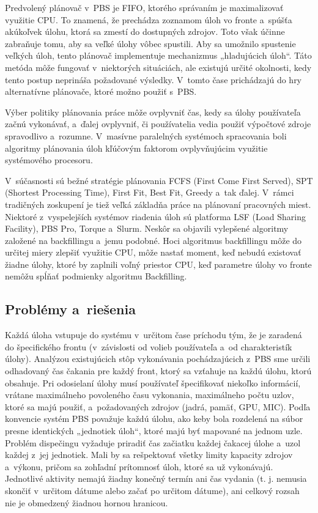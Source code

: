 Predvolený plánovač v~PBS je FIFO, ktorého správaním je maximalizovať využitie CPU. To znamená, že prechádza zoznamom úloh vo fronte a~spúšťa akúkoľvek úlohu, ktorá sa zmestí do dostupných zdrojov. Toto však účinne zabraňuje tomu, aby sa veľké úlohy vôbec spustili. Aby sa umožnilo spustenie veľkých úloh, tento plánovač implementuje mechanizmus „hladujúcich úloh“. Táto metóda môže fungovať v~niektorých situáciách, ale existujú určité okolnosti, kedy tento postup neprináša požadované výsledky. V~tomto čase prichádzajú do hry alternatívne plánovače, ktoré možno použiť s~PBS.~\cite{SherwaniJahanzeb2004Lace}

Výber politiky plánovania práce môže ovplyvniť čas, kedy sa úlohy používateľa začnú vykonávať, a~ďalej ovplyvniť, či používatelia vedia použiť výpočtové zdroje spravodlivo a~rozumne. V~masívne paralelných systémoch spracovania boli algoritmy plánovania úloh kľúčovým faktorom ovplyvňujúcim využitie systémového procesoru.~\cite{HanLuRSAf}

V~súčasnosti sú bežné stratégie plánovania FCFS (First Come First Served), SPT (Shortest Processing Time), First Fit, Best Fit, Greedy a~tak ďalej. V~rámci tradičných zoskupení je tiež veľká základňa práce na plánovaní pracovných miest. Niektoré z~vyspelejších systémov riadenia úloh sú platforma LSF (Load Sharing Facility), PBS Pro, Torque a~Slurm. Neskôr sa objavili vylepšené algoritmy založené na backfillingu a~jemu podobné. Hoci algoritmus backfillingu môže do určitej miery zlepšiť využitie CPU, môže nastať moment, keď nebudú existovať žiadne úlohy, ktoré by zaplnili voľný priestor CPU, keď parametre úlohy vo fronte nemôžu spĺňať podmienky algoritmu Backfilling.~\cite{HanLuRSAf}

\subsection{Problémy a~riešenia}

Každá úloha vstupuje do systému v~určitom čase príchodu tým, že je zaradená do špecifického frontu (v~závislosti od volieb používateľa a~od charakteristík úlohy). Analýzou existujúcich stôp vykonávania pochádzajúcich z~PBS sme určili odhadovaný čas čakania pre každý front, ktorý sa vzťahuje na každú úlohu, ktorú obsahuje. Pri odosielaní úlohy musí používateľ špecifikovať niekoľko informácií, vrátane maximálneho povoleného času vykonania, maximálneho počtu uzlov, ktoré sa majú použiť, a~požadovaných zdrojov (jadrá, pamäť, GPU, MIC). Podľa konvencie systém PBS považuje každú úlohu, ako keby bola rozdelená na súbor presne identických „jednotiek úloh“, ktoré majú byť mapované na jednom uzle. Problém dispečingu vyžaduje priradiť čas začiatku každej čakacej úlohe a~uzol každej z~jej jednotiek. Mali by sa rešpektovať všetky limity kapacity zdrojov a~výkonu, pričom sa zohľadní prítomnosť úloh, ktoré sa už vykonávajú. Jednotlivé aktivity nemajú žiadny konečný termín ani čas vydania (t. j. nemusia skončiť v~určitom dátume alebo začať po určitom dátume), ani celkový rozsah nie je obmedzený žiadnou hornou hranicou. 

